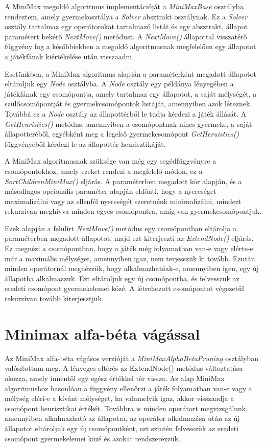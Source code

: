 \documentclass[
]{thesis-ekf}
\theoremstyle{definition}
\theoremstyle{remark}
\begin{document}
A MiniMax megoldó algoritmus implementációját a \emph{MiniMaxBase} osztályba rendeztem, amely gyermekosztálya a \emph{Solver} absztrakt osztálynak. Ez a \emph{Solver} osztály tartalmaz egy operátorokat tartalmazó listát és egy absztrakt, állapot paramétert bekérő \emph{NextMove()} metódust. A \emph{NextMove()} állapottal visszatérő függvény fog a későbbiekben a megoldó algoritmusnak megfelelően egy állapotot a játékfának kiértékelése után visszaadni.

Esetünkben, a MiniMax algoritmus alapján a paraméterként megadott állapotot eltároljuk egy \emph{Node} osztályba. A \emph{Node} osztály egy példánya lényegében a játékfának egy csomópontja, amely tartalmaz egy állapotot, a saját mélységét, a szülőcsomópontját és gyermekcsomópontok listáját, amennyiben azok léteznek. Továbbá ez a \emph{Node} osztály az állapottérből le tudja kérdezi a játék állását. A \emph{GetHeuristics()} metódus, amennyiben a csomópontnak nincs gyermeke, a saját állapotteréből, egyébként meg a legelső gyermekcsomópont \emph{GetHeruistics()} függvényéből kérdezi le az állapottér heurisztikáját. 

A MiniMax algoritmusnak szüksége van még egy segédfüggvényre a csomópontokhoz, amely ezeket rendezi a megfelelő módon, ez a \emph{SortChildrenMiniMax()} eljárás. A paraméterben megadott kör alapján, és a másodlagos opcionális paraméter alapján eldönti, hogy a nyereséget maximalizálni vagy  az ellenfél nyereségét szeretnénk minimalizálni, mindezt rekurzívan meghívva minden egyes csomópontra, amíg van gyermekcsomópontjuk.

Ezek alapján a felülírt \emph{NextMove()} metódus egy csomópontban eltárolja a paraméterben megadott állapotot, majd ezt kiterjeszti az \emph{ExtendNode()} eljárás. Ez megnézi a csomópontban, hogy a játék még folyamatban van-e vagy elérte-e már a maximális mélységet, amennyiben igaz, nem terjesszük ki tovább. Ezután minden operátornál megnézzük, hogy alkalmazhatóak-e, amennyiben igen, egy új állapotba alkalmazzuk. Ezt eltároljuk egy új csomópontba, és felvesszük az eredeti csomópont gyermekelemei közé. A létrehozott csomópontot végezetül rekurzívan tovább kiterjesztjük.

\section{Minimax alfa-béta vágással} \label{minimaxalphabeta}

Az MiniMax alfa-béta vágásos verzióját a \emph{MiniMaxAlphaBetaPruning} osztályban valósítottam meg. A lényeges eltérés az ExtendNode() metódus változtatása okozza, amely innentől egy egész értékkel tér vissza. Az alap MiniMax algoritmushoz hasonlóan a függvény ellenőrzi a játék folyamatban van-e vagy a mélység eléri-e a kívánt mélységet, ha valamelyik igaz, akkor visszaadja a csomópont heurisztikai értékét. Továbbra is minden operátort megvizsgálunk, amennyiben alkalmazható az állapotra, az operátor alkalmazása után az új állapotot eltároljuk egy új csomópontként, ezt szintén felvesszük az eredeti csomópont gyermekelemei közé és azokat rendszerezzük.
\end{document}
